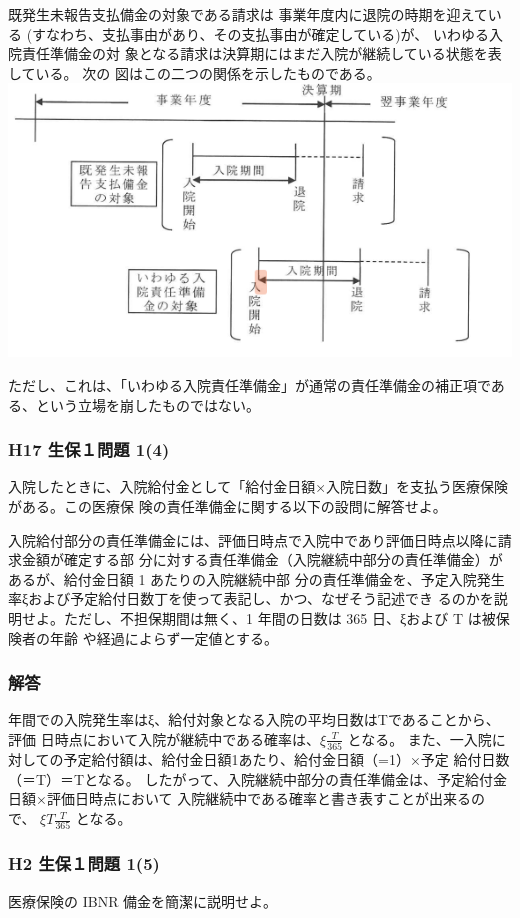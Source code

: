 \documentclass[report,gutter=10mm,fore-edge=10mm,uplatex,dvipdfmx]{jlreq}
\begin{document}
既発生未報告支払備金の対象である請求は
事業年度内に退院の時期を迎えている
(すなわち、支払事由があり、その支払事由が確定している)が、
いわゆる入院責任準備金の対
象となる請求は決算期にはまだ入院が継続している状態を表している。
次の
図はこの二つの関係を示したものである。
\includegraphics[scale=0.8]{images/ProbH5-1-1-1.png}

ただし、これは、「いわゆる入院責任準備金」が通常の責任準備金の補正項である、という立場を崩したものではない。

\subsubsection{H17 生保１問題 1(4)}
入院したときに、入院給付金として「給付金日額×入院日数」を支払う医療保険がある。この医療保
険の責任準備金に関する以下の設問に解答せよ。

入院給付部分の責任準備金には、評価日時点で入院中であり評価日時点以降に請求金額が確定する部
分に対する責任準備金（入院継続中部分の責任準備金）があるが、給付金日額 1 あたりの入院継続中部
分の責任準備金を、予定入院発生率ξおよび予定給付日数丁を使って表記し、かつ、なぜそう記述でき
るのかを説明せよ。ただし、不担保期間は無く、1 年間の日数は 365 日、ξおよび T は被保険者の年齢
や経過によらず一定値とする。
\subsubsection{解答}
年間での入院発生率はξ、給付対象となる入院の平均日数はTであることから、評価
日時点において入院が継続中である確率は、$\xi \frac{T}{365}$ となる。
また、一入院に対しての予定給付額は、給付金日額1あたり、給付金日額（=1）×予定
給付日数（＝T）＝Tとなる。
したがって、入院継続中部分の責任準備金は、予定給付金日額×評価日時点において
入院継続中である確率と書き表すことが出来るので、
$\xi T\frac{T}{365}$ となる。
\subsubsection{H2 生保１問題 1(5)}
医療保険の IBNR 備金を簡潔に説明せよ。
\end{document}
